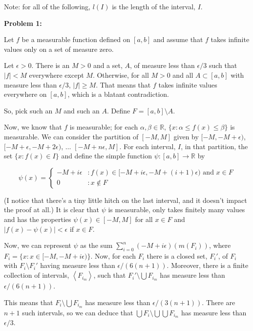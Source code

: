\documentclass[a4paper,12pt]{article}
\newcommand{\absval}[1]{\left\lvert #1 \right\rvert}
\newcommand{\anbrack}[1]{\left\langle #1 \right\rangle}
\newcommand{\al}{\alpha} %
\newcommand{\be}{\beta}
\newcommand{\ep}{\epsilon}
\newcommand{\R}{\mathbb{R}}
\begin{document}
Note: for all of the following, $l(I)$ is the length of the interval, $I$.

{\bf Problem 1:} %

Let $f$ be a measurable function defined on $[a,b]$ and assume that $f$ takes infinite values only on a set of measure zero. 

Let $\ep >0$. There is an $M >0$ and a set, $A$, of measure less than $\ep/3$ such that $\absval{f} < M$ everywhere except $M$. Otherwise, for all $M >0$ and all $A \subset [a,b]$ with measure less than $\ep/3$, $\absval{f} \geq M$. That means that $f$ takes infinite values everywhere on $[a,b]$, which is a blatant contradiction.

So, pick such an $M$ and such an $A$. Define $F = [a,b] \setminus A$. 

Now, we know that $f$ is measurable; for each $\al, \be \in \R$, $\{x: \al \leq f(x) \leq \be\}$ is measurable. We can consider the partition of $[-M,M]$ given by $[-M, -M + \ep)$, $[-M+\ep, -M+2\ep)$, $\ldots$ $[-M + n\ep, M]$. For each interval, $I$, in that partition, the set $\{x: f(x) \in I\}$ and define the simple function $\psi: [a,b] \to \R$ by

\begin{displaymath}
   \psi(x) = \left\{
     \begin{array}{lr}
       -M+i\ep & : f(x) \in [-M+i\ep, -M+(i+1)\ep) \text{ and } x \in F\\
       0 & : x \notin F
     \end{array}
   \right.
\end{displaymath} 

(I notice that there's a tiny little hitch on the last interval, and it doesn't impact the proof at all.) It is clear that $\psi$ is measurable, only takes finitely many values and has the properties $\psi(x) \in [-M,M]$ for all $x \in F$ and $\absval{f(x) - \psi(x)} < \ep$ if $x \in F$. 

Now, we can represent $\psi$ as the sum $\sum\limits_{i=0}^n (-M+i\ep)(m(F_i))$, where $F_i = \{x: x \in [-M,-M+i\ep)\}$. Now, for each $F_i$ there is a closed set, $F_i'$, of $F_i$ with $F_i \setminus F_i'$ having measure less than $\ep/(6(n+1))$. Moreover, there is a finite collection of intervals, $\anbrack{F_{i_m}}$, such that $F_i' \setminus \bigcup F_{i_m}$ has measure less than $\ep/(6(n+1))$.

This means that $F_i \setminus \bigcup F_{i_m}$ has measure less than $\ep/(3(n+1))$. There are $n+1$ such intervals, so we can deduce that $\bigcup F_i \setminus \bigcup \bigcup F_{i_m}$ has measure less than $\ep/3$.
\end{document}
